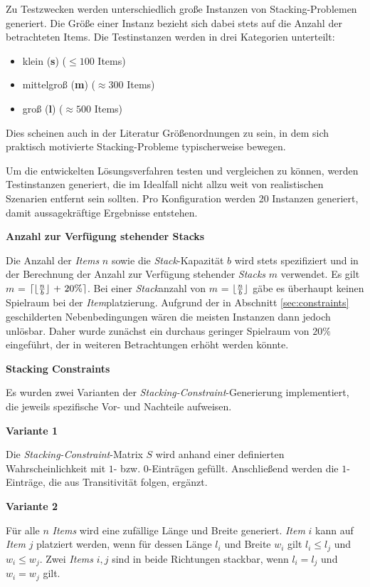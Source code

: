 Zu Testzwecken werden unterschiedlich große Instanzen von Stacking-Problemen generiert. Die Größe einer
Instanz bezieht sich dabei stets auf die Anzahl der betrachteten Items. Die Testinstanzen werden
in drei Kategorien unterteilt:
\begin{itemize}
  \item klein (\textbf{s}) ($\leq 100$ Items)
  \item mittelgroß (\textbf{m}) ($\approx 300$ Items)
  \item groß (\textbf{l}) ($\approx 500$ Items)\newline
\end{itemize}
Dies scheinen auch in der Literatur Größenordnungen zu sein, in dem sich praktisch motivierte Stacking-Probleme
typischerweise bewegen. \cite{Le2016}

Um die entwickelten Lösungsverfahren testen und vergleichen zu können, werden Testinstanzen generiert,
die im Idealfall nicht allzu weit von realistischen Szenarien entfernt sein sollten.
Pro Konfiguration werden 20 Instanzen generiert, damit aussagekräftige Ergebnisse entstehen.

\textbf{Anzahl zur Verfügung stehender Stacks}

Die Anzahl der \textit{Items} $n$ sowie die \textit{Stack}-Kapazität $b$ wird stets spezifiziert und in der Berechnung der Anzahl
zur Verfügung stehender \textit{Stacks} $m$ verwendet. Es gilt $m$ = $\ceil{\floor{\frac{n}{b}}$ + $20 \%}$.
Bei einer \textit{Stack}anzahl von $m$ = $\lfloor\frac{n}{b}\rfloor$ gäbe es überhaupt keinen Spielraum bei der \textit{Item}platzierung. Aufgrund der in Abschnitt \ref{sec:constraints} geschilderten Nebenbedingungen wären die meisten Instanzen dann jedoch unlösbar.
Daher wurde zunächst ein durchaus geringer Spielraum von $20 \%$ eingeführt, der in weiteren Betrachtungen erhöht werden könnte.

\textbf{Stacking Constraints}

Es wurden zwei Varianten der \textit{Stacking-Constraint}-Generierung implementiert, die jeweils spezifische Vor- und Nachteile aufweisen.

\textbf{Variante 1}

Die \textit{Stacking-Constraint}-Matrix $S$ wird anhand einer definierten Wahrscheinlichkeit mit $1$- bzw. $0$-Einträgen gefüllt.
Anschließend werden die $1$-Einträge, die aus Transitivität folgen, ergänzt.

\textbf{Variante 2}

Für alle $n$ \textit{Items} wird eine zufällige Länge und Breite generiert. \textit{Item} $i$ kann auf \textit{Item} $j$ platziert werden,
wenn für dessen Länge $l_i$ und Breite $w_i$ gilt $l_i \leq l_j$ und $w_i \leq w_j$.
Zwei \textit{Items} $i, j$ sind in beide Richtungen stackbar, wenn $l_i = l_j$ und $w_i = w_j$ gilt.

